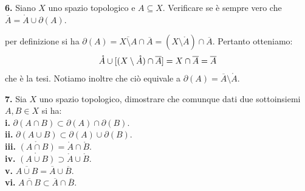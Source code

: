 \documentclass[oneside, 11pt]{amsbook}
\makeatletter
\newcommand{\0}{{(0)}}
\newcommand{\3}{{(3)}}
\theoremstyle{colonplain}
\theoremstyle{colondefinition}
\theoremstyle{colonremark}
\numberwithin{equation}{chapter}
\renewcommand{\proofname}{Dimostrazione}
\renewenvironment{proof}[1][\proofname]{\par
  \pushQED{\qed}%
  \normalfont \topsep6\p@\@plus6\p@\relax
  \trivlist
  \item[\hskip\labelsep\bfseries #1:]\ignorespaces
}{%
  \popQED\endtrivlist\@endpefalse
}
\makeatother
\begin{document}
\textbf{6.} Siano $X$ uno spazio topologico e $A \subseteq X$. Verificare se è sempre vero che $\overline{A} = \mathring{A} \cup \partial(A)$.
\begin{proof}
per definizione si ha $\partial(A) = \overline{X \setminus A} \cap \overline{A} = (X \setminus \mathring{A}) \cap \overline{A}$. Pertanto otteniamo:
\begin{align}
    \mathring{A} \cup [(X \setminus \mathring{A}) \cap \overline{A}] = X \cap \overline{A} = \overline{A} \notag
\end{align}
che è la tesi. Notiamo inoltre che ciò equivale a $\partial(A) = \overline{A} \setminus \mathring{A}$.
\end{proof}

\textbf{7.} Sia $X$ uno spazio topologico, dimostrare che comunque dati due sottoinsiemi $A, B \in X$ si ha: \\
\textbf{i.} $\partial (A \cap B) \subset \partial (A) \cap \partial (B)$. \\
\textbf{ii.} $\partial (A \cup B) \subset \partial (A) \cup \partial (B)$. \\
\textbf{iii.} $\mathring{(A \cap B)} = \mathring{A} \cap \mathring{B}$. \\
\textbf{iv.} $\mathring{(A \cup B)} \supset \mathring{A} \cup \mathring{B}$. \\
\textbf{v.} $\overline{A \cup B} = \overline{A} \cup \overline{B}$. \\
\textbf{vi.} $\overline{A \cap B} \subset \overline{A} \cap \overline{B}$.
\end{document}
